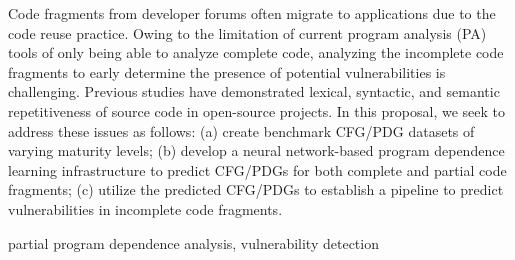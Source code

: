  Code fragments from developer forums often migrate to applications due to the code reuse practice. Owing to the limitation of current program analysis (PA) tools of only being able to analyze complete code, analyzing the incomplete code fragments to early determine the presence of potential vulnerabilities is challenging. Previous studies have demonstrated lexical, syntactic, and semantic repetitiveness of source code in open-source projects. In this proposal, we seek to address these issues as follows: (a) create benchmark CFG/PDG datasets of varying maturity levels; (b) develop a neural network-based program dependence learning infrastructure to predict CFG/PDGs for both complete and partial code fragments; (c) utilize the predicted CFG/PDGs to establish a pipeline to predict vulnerabilities in incomplete code fragments.

\vspace{0.25em}
 partial program dependence analysis, vulnerability detection 